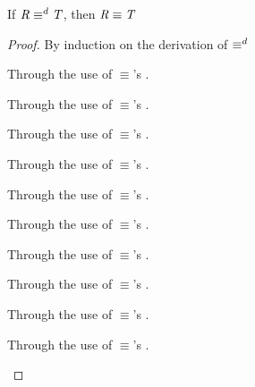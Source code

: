 \documentclass[numbers,10pt,preprint\ifanon ,nocopyrightspace\fi]{sigplanconf}
\begin{document}
\begin{lemma}
  \label{lem:defequiv-finer-equiv}
  If $\mathit{R} \equiv^d \mathit{T}$, then $\mathit{R} \equiv \mathit{T}$
\end{lemma}
\begin{proof}
  By induction on the derivation of $\equiv^d$
  
  \begin{case}[\OrIdentityRule{}]
    Through the use of $\equiv$'s \OrIdentityRule{}.
  \end{case}
  
  \begin{case}[\EmptyProjectionRightRule{}]
    Through the use of $\equiv$'s \EmptyProjectionRightRule{}.
  \end{case}
  
  \begin{case}[\EmptyProjectionLeftRule{}]
    Through the use of $\equiv$'s \EmptyProjectionLeftRule{}.
  \end{case}
  
  \begin{case}[\ConcatAssocRule{}]
    Through the use of $\equiv$'s \ConcatAssocRule{}.
  \end{case}
  
  \begin{case}[\OrAssociativityRule{}]
    Through the use of $\equiv$'s \OrAssociativityRule{}.
  \end{case}

  \begin{case}[\OrCommutativityRule{}]
    Through the use of $\equiv$'s \OrCommutativityRule{}.
  \end{case}

  \begin{case}[\DistributivityLeftRule{}]
    Through the use of $\equiv$'s \DistributivityLeftRule{}.
  \end{case}

  \begin{case}[\DistributivityRightRule{}]
    Through the use of $\equiv$'s \DistributivityRightRule{}.
  \end{case}

  \begin{case}[\ConcatIdentityLeftRule{}]
    Through the use of $\equiv$'s \ConcatIdentityLeftRule{}.
  \end{case}

  \begin{case}[\ConcatIdentityRightRule{}]
    Through the use of $\equiv$'s \ConcatIdentityRightRule{}.
  \end{case}


\end{proof}
\end{document}
